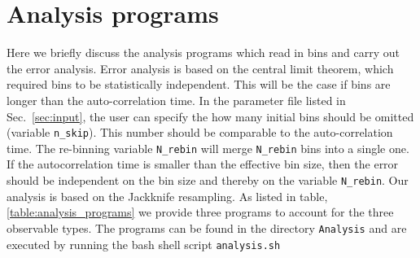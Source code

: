 \section{ Analysis programs }\label{sec:analysis}

Here we briefly discuss the analysis programs which read in bins and carry out the error analysis.  Error analysis   is based  on the central limit theorem,  which required bins to be statistically independent. This will be the case if bins are  longer than the auto-correlation time.  In the parameter file listed in Sec.~\ref{sec:input}, the user  can specify the how many initial bins should be omitted (variable \texttt{n\_skip}). This  number should be comparable to the auto-correlation time.     The    re-binning  variable 
\texttt{N\_rebin} will merge \texttt{N\_rebin}  bins into a single one.  If the autocorrelation time  is smaller than the effective bin size, then the error should be independent on the bin size and thereby on the variable \texttt{N\_rebin}.  Our analysis is based on the Jackknife resampling.  As listed in table,  \ref{table:analysis_programs}  we provide three programs to account for the three observable types. The programs can be found in the directory \texttt{Analysis}  and   are executed by running the  bash shell script 
\texttt{analysis.sh}

